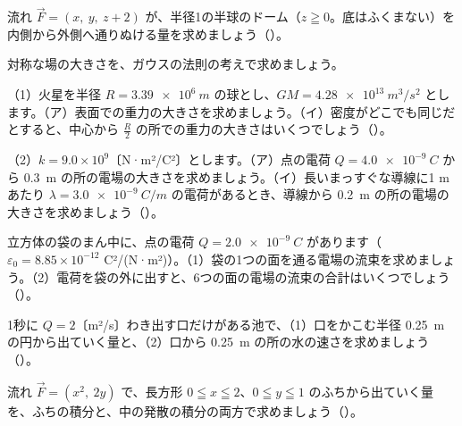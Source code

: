 \bkproblem 流れ $\vec F=(x,\ y,\ z+2)$ が、半径1の半球のドーム（$z\geqq0$。底はふくまない）を内側から外側へ通りぬける量を求めましょう\mbox{（）}。

\bkproblem 対称な場の大きさを、ガウスの法則の考えで求めましょう。\par
（1）火星を半径 $R=\qty{3.39e6}{m}$ の球とし、$GM=\qty{4.28e13}{m^3/s^2}$ とします。（ア）表面での重力の大きさを求めましょう。（イ）密度がどこでも同じだとすると、中心から $\frac{R}{2}$ の所での重力の大きさはいくつでしょう\mbox{（）}。\par
（2）$k=9.0\times10^9$〔N·m²/C²〕とします。（ア）点の電荷 $Q=\qty{4.0e-9}{C}$ から \qty{0.3}{m} の所の電場の大きさを求めましょう。（イ）長いまっすぐな導線に1 m あたり $\lambda=\qty{3.0e-9}{C/m}$ の電荷があるとき、導線から \qty{0.2}{m} の所の電場の大きさを求めましょう\mbox{（）}。

\bkproblem 立方体の袋のまん中に、点の電荷 $Q=\qty{2.0e-9}{C}$ があります（$\varepsilon_0=8.85\times10^{-12}$ C²/(N·m²)）。（1）袋の1つの面を通る電場の流束を求めましょう。（2）電荷を袋の外に出すと、6つの面の電場の流束の合計はいくつでしょう\mbox{（）}。

\bkproblem 1秒に $Q=2$〔m²/s〕わき出す口だけがある池で、（1）口をかこむ半径 \qty{0.25}{m} の円から出ていく量と、（2）口から \qty{0.25}{m} の所の水の速さを求めましょう\mbox{（）}。

\bkproblem 流れ $\vec F=(x^2,\ 2y)$ で、長方形 $0\leqq x\leqq2$、$0\leqq y\leqq1$ のふちから出ていく量を、ふちの積分と、中の発散の積分の両方で求めましょう\mbox{（）}。


